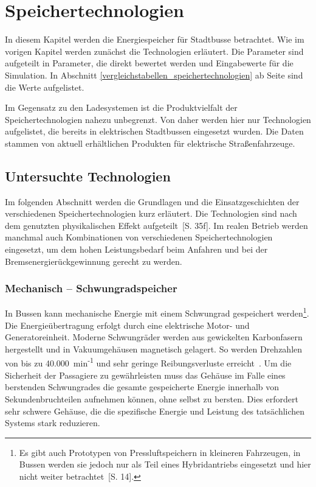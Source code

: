 \chapter{Speichertechnologien}

In diesem Kapitel werden die Energiespeicher für Stadtbusse betrachtet. Wie im vorigen Kapitel werden zunächst die Technologien erläutert. Die Parameter sind aufgeteilt in Parameter, die direkt bewertet werden und Eingabewerte für die Simulation. In Abschnitt \ref{vergleichstabellen_speichertechnologien} ab Seite \pageref{vergleichstabellen_speichertechnologien} sind die Werte aufgelistet. 

Im Gegensatz zu den Ladesystemen ist die Produktvielfalt der Speichertechnologien nahezu unbegrenzt. Von daher werden hier nur Technologien aufgelistet, die bereits in elektrischen Stadtbussen eingesetzt wurden. Die Daten stammen von aktuell erhältlichen Produkten für elektrische Straßenfahrzeuge.

\section{Untersuchte Technologien}
Im folgenden Abschnitt werden die Grundlagen und die Einsatzgeschichten der verschiedenen Speichertechnologien kurz erläutert. Die Technologien sind nach dem genutzten physikalischen Effekt aufgeteilt~\cite{Sterner:2014}[S. 35f]. Im realen Betrieb werden manchmal auch Kombinationen von verschiedenen Speichertechnologien eingesetzt, um dem hohen Leistungsbedarf beim Anfahren und bei der Bremsenergierückgewinnung gerecht zu werden.

\subsection{Mechanisch – Schwungradspeicher}
In Bussen kann mechanische Energie mit einem Schwungrad gespeichert werden\footnote{Es gibt auch Prototypen von Pressluftspeichern in kleineren Fahrzeugen, in Bussen werden sie jedoch nur als Teil eines Hybridantriebs eingesetzt und hier nicht weiter betrachtet~\cite{Sebastian-Naumann:2014}[S. 14].}. Die Energieübertragung erfolgt durch eine elektrische Motor- und Generatoreinheit. Moderne Schwungräder werden aus gewickelten Karbonfasern hergestellt und in Vakuumgehäusen magnetisch gelagert. So werden Drehzahlen von bis zu 40.000~min\textsuperscript{-1} und sehr geringe Reibungsverluste erreicht~\cite{993788}. Um die Sicherheit der Passagiere zu gewährleisten muss das Gehäuse im Falle eines berstenden Schwungrades die gesamte gespeicherte Energie innerhalb von Sekundenbruchteilen aufnehmen können, ohne selbst zu bersten. Dies erfordert sehr schwere Gehäuse, die die spezifische Energie und Leistung des tatsächlichen Systems stark reduzieren.

